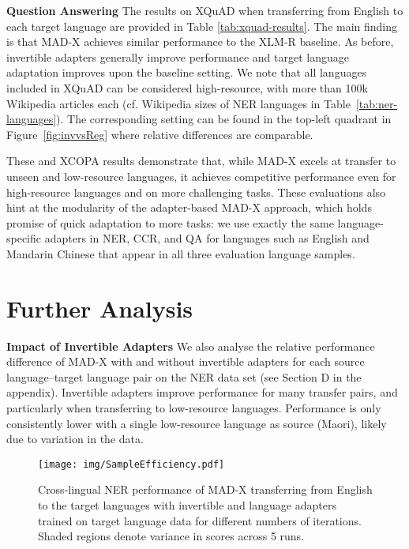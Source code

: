 \documentclass[11pt,a4paper]{article}
\newcommand{\model}[1]{\textsc{MAD-X}}
\newcommand{\xlmr}[1]{\textsc{XLM-R}}
\begin{document}
\vspace{1.8mm}
\noindent \textbf{Question Answering}\hspace{0.3mm} \label{ss:qa}
The results on XQuAD when transferring from English to each target language are provided in Table \ref{tab:xquad-results}. The main finding is that \model{} achieves similar performance to the \xlmr{} baseline. As before, invertible adapters generally improve performance and target language adaptation improves upon the baseline setting. We note that all languages included in XQuAD can be considered high-resource, with more than 100k Wikipedia articles each (cf. Wikipedia sizes of NER languages in Table~\ref{tab:ner-languages}). The corresponding setting can be found in the top-left quadrant in Figure~\ref{fig:invvsReg} where relative differences are comparable.

These and XCOPA results demonstrate that, while \model{} excels at transfer to unseen and low-resource languages, it achieves competitive performance even for high-resource languages and on more challenging tasks. These evaluations also hint at the modularity of the adapter-based \model{} approach, which holds promise of quick adaptation to more tasks: we use exactly the same language-specific adapters in NER, CCR, and QA for languages such as English and Mandarin Chinese that appear in all three evaluation language samples.


\section{Further Analysis}

\noindent \textbf{Impact of Invertible Adapters}\hspace{0.3mm} 
We also analyse the relative performance difference of \model{} with and without invertible adapters for each source language--target language pair on the NER data set (see Section D in the appendix). 
Invertible adapters improve performance for many transfer pairs, and particularly when transferring to low-resource languages. Performance is only consistently lower with a single low-resource language as source (Maori), likely due to variation in the data. 



 \begin{figure} \centering
\texttt{[image: img/SampleEfficiency.pdf]}
\caption{Cross-lingual NER performance of \model{} transferring from English to the target languages with invertible and language adapters trained on target language data for different numbers of iterations. Shaded regions denote variance in  scores across 5 runs.}
\label{fig:sample_eff}
\end{figure}
\end{document}
